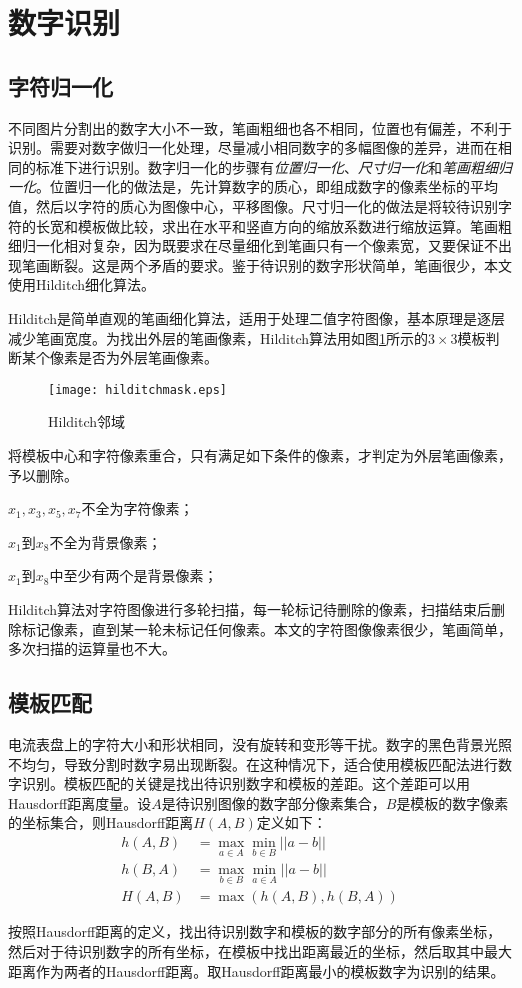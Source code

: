 \section{数字识别}

\subsection{字符归一化}

不同图片分割出的数字大小不一致，笔画粗细也各不相同，位置也有偏差，不利于识别。需要对数字做归一化处理，尽量减小相同数字的多幅图像的差异，进而在相同的标准下进行识别。数字归一化的步骤有\emph{位置归一化}、\emph{尺寸归一化}和\emph{笔画粗细归一化}。位置归一化的做法是，先计算数字的质心，即组成数字的像素坐标的平均值，然后以字符的质心为图像中心，平移图像。尺寸归一化的做法是将较待识别字符的长宽和模板做比较，求出在水平和竖直方向的缩放系数进行缩放运算。笔画粗细归一化相对复杂，因为既要求在尽量细化到笔画只有一个像素宽，又要保证不出现笔画断裂。这是两个矛盾的要求。鉴于待识别的数字形状简单，笔画很少，本文使用Hilditch细化算法。

Hilditch是简单直观的笔画细化算法，适用于处理二值字符图像，基本原理是逐层减少笔画宽度。为找出外层的笔画像素，Hilditch算法用如图\ref{fig:hilditchmask}所示的$3\times 3$模板判断某个像素是否为外层笔画像素。
\begin{figure}[h]
  \centering
  \texttt{[image: hilditchmask.eps]}
  \caption{Hilditch邻域}
  \label{fig:hilditchmask}
\end{figure}
将模板中心和字符像素重合，只有满足如下条件的像素，才判定为外层笔画像素，予以删除。
\begin{asparaenum}[(1)]

\item $x_1,x_3,x_5,x_7$不全为字符像素；
\item $x_1$到$x_8$不全为背景像素；
\item $x_1$到$x_8$中至少有两个是背景像素；
\end{asparaenum}

Hilditch算法对字符图像进行多轮扫描，每一轮标记待删除的像素，扫描结束后删除标记像素，直到某一轮未标记任何像素。本文的字符图像像素很少，笔画简单，多次扫描的运算量也不大。

\subsection{模板匹配}

电流表盘上的字符大小和形状相同，没有旋转和变形等干扰。数字的黑色背景光照不均匀，导致分割时数字易出现断裂。在这种情况下，适合使用模板匹配法进行数字识别。模板匹配的关键是找出待识别数字和模板的差距。这个差距可以用Hausdorff距离度量。设$A$是待识别图像的数字部分像素集合，$B$是模板的数字像素的坐标集合，则Hausdorff距离$H(A,B)$定义如下：
\begin{equation}
  \begin{aligned}
    h(A,B)&=\max_{a\in A}\min_{b\in B}||a-b||\\
    h(B,A)&=\max_{b\in B}\min_{a\in A}||a-b||\\
    H(A,B)&=\max(h(A,B),h(B,A))
  \end{aligned}
\end{equation}

按照Hausdorff距离的定义，找出待识别数字和模板的数字部分的所有像素坐标，然后对于待识别数字的所有坐标，在模板中找出距离最近的坐标，然后取其中最大距离作为两者的Hausdorff距离。取Hausdorff距离最小的模板数字为识别的结果。

